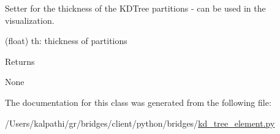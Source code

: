 Setter for the thickness of the K\+D\+Tree partitions -\/ can be used in the visualization. 

(float) th\+: thickness of partitions \begin{DoxyReturn}{Returns}


None 
\end{DoxyReturn}


The documentation for this class was generated from the following file\+:\begin{DoxyCompactItemize}
\item 
/\+Users/kalpathi/gr/bridges/client/python/bridges/\mbox{\hyperlink{kd__tree__element_8py}{kd\+\_\+tree\+\_\+element.\+py}}\end{DoxyCompactItemize}
